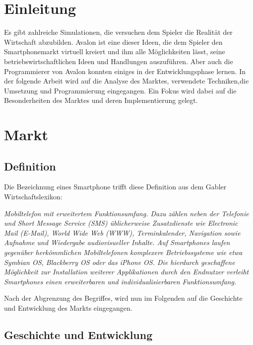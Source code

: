 
\chapter{Einleitung}
Es gibt zahlreiche Simulationen, die versuchen dem Spieler die Realität der Wirtschaft abzubilden. Avalon ist eine dieser Ideen, die dem Spieler den Smartphonemarkt virtuell kreiert und ihm alle Möglichkeiten lässt, seine betriebswirtschaftlichen Ideen und Handlungen auszuführen. Aber auch die Programmierer von Avalon konnten einiges in  der Entwicklungsphase lernen. In der folgende Arbeit wird auf die Analyse des Marktes, verwendete Techniken,die Umsetzung und Programmierung eingegangen. Ein Fokus wird dabei auf die Besonderheiten des Marktes und deren Implementierung gelegt.
\chapter{Markt}

\section{Definition}

Die Bezeichnung eines Smartphone trifft diese Definition aus dem Gabler Wirtschaftslexikon:

\textit{Mobiltelefon mit erweitertem Funktionsumfang. Dazu zählen neben der Telefonie und Short Message Service (SMS) üblicherweise Zusatzdienste wie Electronic Mail (E-Mail), World Wide Web (WWW), Terminkalender, Navigation sowie Aufnahme und Wiedergabe audiovisueller Inhalte. Auf Smartphones laufen gegenüber herkömmlichen Mobiltelefonen komplexere Betriebssysteme wie etwa Symbian OS, Blackberry OS oder das iPhone OS. Die hierdurch geschaffene Möglichkeit zur Installation weiterer Applikationen durch den Endnutzer verleiht Smartphones einen erweiterbaren und individualisierbaren Funktionsumfang.}

Nach der Abgrenzung des Begriffes, wird nun im Folgenden auf die Geschichte und Entwicklung des Markts eingegangen.


\section{Geschichte und Entwicklung}

